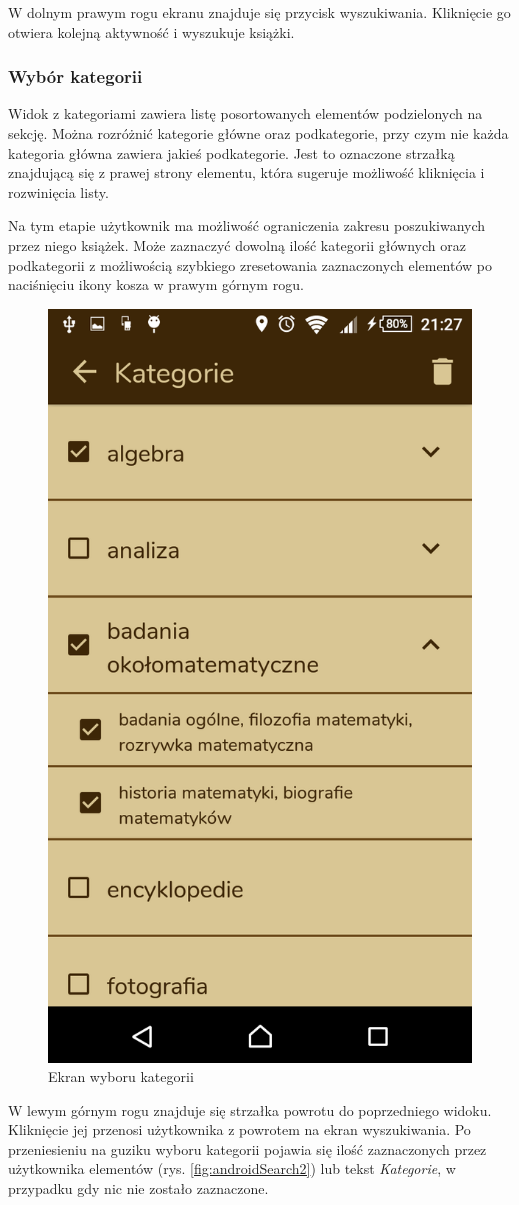 \documentclass[twoside]{projektInzynierskiMS}
\begin{document}
W dolnym prawym rogu ekranu znajduje się przycisk wyszukiwania. Kliknięcie go otwiera kolejną aktywność i wyszukuje książki.

\subsubsection{Wybór kategorii}

Widok z kategoriami zawiera listę posortowanych elementów podzielonych na sekcję. Można rozróżnić kategorie główne oraz podkategorie, przy czym nie każda kategoria główna zawiera jakieś podkategorie. Jest to oznaczone strzałką znajdującą się z prawej strony elementu, która sugeruje możliwość kliknięcia i rozwinięcia listy. 

Na tym etapie użytkownik ma możliwość ograniczenia zakresu poszukiwanych przez niego książek. Może zaznaczyć dowolną ilość kategorii głównych oraz podkategorii z możliwością szybkiego zresetowania zaznaczonych elementów po naciśnięciu ikony kosza w prawym górnym rogu. 

\begin{figure}[h]
  \centering
  \includegraphics[width=0.4\linewidth]{img/android/android4.png}
  \caption{Ekran wyboru kategorii}
  \label{fig:androidCategoriesScreen}
\end{figure}

W lewym górnym rogu znajduje się strzałka powrotu do poprzedniego widoku. Kliknięcie jej przenosi użytkownika z powrotem na ekran wyszukiwania. Po przeniesieniu na guziku wyboru kategorii pojawia się ilość zaznaczonych przez użytkownika elementów (rys. \ref{fig:androidSearch2}) lub tekst \textit{Kategorie}, w przypadku gdy nic nie zostało zaznaczone.
\end{document}

